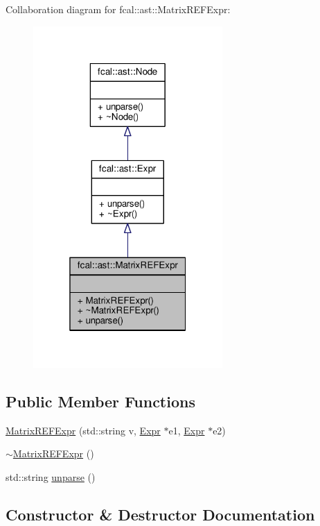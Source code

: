 Collaboration diagram for fcal\+:\+:ast\+:\+:Matrix\+R\+E\+F\+Expr\+:
\nopagebreak
\begin{figure}[H]
\begin{center}
\leavevmode
\includegraphics[width=205pt]{classfcal_1_1ast_1_1MatrixREFExpr__coll__graph}
\end{center}
\end{figure}
\subsection*{Public Member Functions}
\begin{DoxyCompactItemize}
\item 
\hyperlink{classfcal_1_1ast_1_1MatrixREFExpr_ac78d9a20c09f0d40e797d759dffbd8c9}{Matrix\+R\+E\+F\+Expr} (std\+::string v, \hyperlink{classfcal_1_1ast_1_1Expr}{Expr} $\ast$e1, \hyperlink{classfcal_1_1ast_1_1Expr}{Expr} $\ast$e2)
\item 
\hyperlink{classfcal_1_1ast_1_1MatrixREFExpr_acc8668ee53ccf2e33063b93207f59781}{$\sim$\+Matrix\+R\+E\+F\+Expr} ()
\item 
std\+::string \hyperlink{classfcal_1_1ast_1_1MatrixREFExpr_a894e3996a1b1703dc767433df98b551f}{unparse} ()
\end{DoxyCompactItemize}


\subsection{Constructor \& Destructor Documentation}
